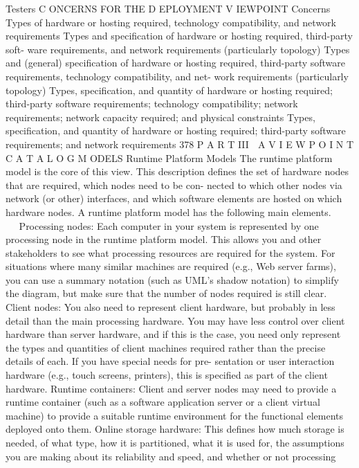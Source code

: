Testers
C ONCERNS FOR THE D EPLOYMENT V IEWPOINT
Concerns
Types of hardware or hosting required, technology compatibility, and
network requirements
Types and specification of hardware or hosting required, third-party soft-
ware requirements, and network requirements (particularly topology)
Types and (general) specification of hardware or hosting required,
third-party software requirements, technology compatibility, and net-
work requirements (particularly topology)
Types, specification, and quantity of hardware or hosting required;
third-party software requirements; technology compatibility; network
requirements; network capacity required; and physical constraints
Types, specification, and quantity of hardware or hosting required;
third-party software requirements; and network requirements
378
 P A R T III  A V I E W P O I N T C A T A L O G
M ODELS
Runtime Platform Models
The runtime platform model is the core of this view. This description defines
the set of hardware nodes that are required, which nodes need to be con-
nected to which other nodes via network (or other) interfaces, and which
software elements are hosted on which hardware nodes.
A runtime platform model has the following main elements.
Processing nodes: Each computer in your system is represented by one
processing node in the runtime platform model. This allows you and
other stakeholders to see what processing resources are required for
the system. For situations where many similar machines are required
(e.g., Web server farms), you can use a summary notation (such as
UML’s shadow notation) to simplify the diagram, but make sure that the
number of nodes required is still clear.
Client nodes: You also need to represent client hardware, but probably in
less detail than the main processing hardware. You may have less control
over client hardware than server hardware, and if this is the case, you
need only represent the types and quantities of client machines required
rather than the precise details of each. If you have special needs for pre-
sentation or user interaction hardware (e.g., touch screens, printers),
this is specified as part of the client hardware.
Runtime containers: Client and server nodes may need to provide a
runtime container (such as a software application server or a client
virtual machine) to provide a suitable runtime environment for the
functional elements deployed onto them.
Online storage hardware: This defines how much storage is needed, of
what type, how it is partitioned, what it is used for, the assumptions you
are making about its reliability and speed, and whether or not processing
